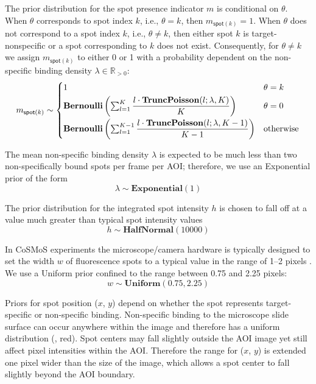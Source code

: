 The prior distribution for the spot presence indicator $m$ is conditional on $\theta$. When $\theta$ corresponds to spot index $k$, i.e., $\theta = k$, then $m_{\mathsf{spot}(k)} = 1$. When $\theta$ does not correspond to a spot index $k$, i.e., $\theta \neq k$, then either spot $k$ is target-nonspecific or a spot corresponding to $k$ does not exist. Consequently, for $\theta \neq k$ we assign $m_{\mathsf{spot}(k)}$ to either 0 or 1 with a probability dependent on the non-specific binding density $\lambda \in \mathbb{R}_{>0}$:
%
\begin{equation}
    m_{\mathsf{spot}(k)} \sim
    \begin{cases}
        1 & \text{$\theta = k$} \\
        \mathbf{Bernoulli} \left( \sum_{l=1}^K \dfrac{l \cdot \mathbf{TruncPoisson}(l; \lambda, K)}{K} \right) & \text{$\theta = 0$} \rule{0pt}{4ex} \\
        \mathbf{Bernoulli} \left( \sum_{l=1}^{K-1} \dfrac{l \cdot \mathbf{TruncPoisson}(l; \lambda, K-1)}{K-1} \right) & \text{otherwise} \rule{0pt}{4ex}
    \end{cases}
\end{equation}

The mean non-specific binding density $\lambda$ is expected to be much less than two non-specifically bound spots per frame per AOI; therefore, we use an Exponential prior of the form
%
\begin{equation}
    \lambda \sim \mathbf{Exponential}(1)
\end{equation}

The prior distribution for the integrated spot intensity $h$ is chosen to fall off at a value much greater than typical spot intensity values 
%
\begin{equation}
    h \sim \mathbf{HalfNormal}(10000)
\end{equation}

In CoSMoS experiments the microscope/camera hardware is typically designed to set the width $w$ of fluorescence spots to a  typical value in the range of 1--2 pixels \citep{Ober2015-ba}. We use a Uniform prior confined to the range between 0.75 and 2.25 pixels:
%
\begin{equation}
    w \sim \mathbf{Uniform}(0.75, 2.25)
\end{equation}

Priors for spot position ($x$, $y$) depend on whether the spot represents target-specific or non-specific binding. Non-specific binding to the microscope slide surface can occur anywhere within the image and therefore has a uniform distribution (, red). Spot centers may fall slightly outside the AOI image yet still affect pixel intensities within the AOI.  Therefore the range for ($x$, $y$) is extended one pixel wider than the size of the image, which allows a spot center to fall slightly beyond the AOI boundary.

